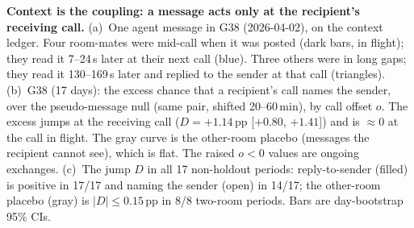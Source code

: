 \caption{\textbf{Context is the coupling: a message acts only at the recipient's receiving call.}
(a)~One agent message in G38 (2026-04-02), on the context ledger. Four room-mates were mid-call when it was posted (dark bars, in flight); they read it 7--24\,s later at their next call (blue). Three others were in long gaps; they read it 130--169\,s later and replied to the sender at that call (triangles).
(b)~G38 (17 days): the excess chance that a recipient's call names the sender, over the pseudo-message null (same pair, shifted 20--60\,min), by call offset $o$. The excess jumps at the receiving call ($D=+1.14$\,pp [$+0.80$, $+1.41$]) and is $\approx 0$ at the call in flight. The gray curve is the other-room placebo (messages the recipient cannot see), which is flat. The raised $o<0$ values are ongoing exchanges.
(c)~The jump $D$ in all 17 non-holdout periods: reply-to-sender (filled) is positive in 17/17 and naming the sender (open) in 14/17; the other-room placebo (gray) is $|D|\le0.15$\,pp in 8/8 two-room periods. Bars are day-bootstrap 95\% CIs.}
\label{fig:H08}
